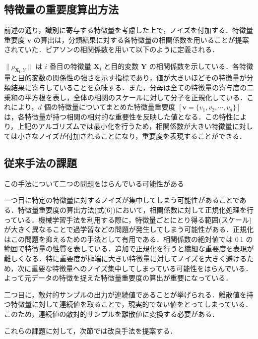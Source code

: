 \subsection{特徴量の重要度算出方法}

前述の通り，識別に寄与する特徴量を考慮した上で，ノイズを付加する．特徴量重要度 $\bm{v}$ の算出は，分類結果に対する各特徴量の相関係数を用いることが提案されていた．ピアソンの相関係数を用いて以下のように定義される．

$\|\rho_{\bm{X_i},Y}\|$ は $i$ 番目の特徴量 $\bm{X_i}$ と目的変数 $\bm{Y}$ の相関係数を示している．各特徴量と目的変数の関係性の強さを示す指標であり，値が大きいほどその特徴量が分類結果に寄与していることを意味する．また，分母は全ての特徴量の寄与度の二乗和の平方根を表し，全体の相関のスケールに対して分子を正規化している．これにより，$d$ 個の特徴量についてまとめた特徴量重要度 $[ \bm{v} = \{v_1, v_2, \cdots, v_d\} ]$ は，各特徴量が持つ相関の相対的な重要性を反映した値となる．この特性により，上記のアルゴリズムでは最小化を行うため，相関係数が大きい特徴量に対しては小さなノイズが付加されることになり，重要度を表現することができる．



\subsection{従来手法の課題}

この手法について二つの問題をはらんでいる可能性がある

一つ目に特定の特徴量に対するノイズが集中してしまう可能性があることである．特徴量重要度の算出方法(式(6))において，相関係数に対して正規化処理を行っている．機械学習手法を利用する際に，特徴量ごとにとり得る範囲(スケール)が大きく異なることで過学習などの問題が発生してしまう可能性がある．正規化はこの問題を抑えるための手法として有用である．\cite{LawOfAwesomeDataScientist}相関係数の絶対値では $0~1$ の範囲で特徴量の性質を表している．追加で正規化を行うと繊細な重要度を表現が難しくなる．特に重要度が極端に大きい特徴量に対してノイズを大きく避けるため，次に重要な特徴量へのノイズ集中してしまっている可能性をはらんでいる．よって元データの特徴を捉えた特徴量重要度の算出が重要になっている．

二つ目に，敵対的サンプルの出力が連続値であることが挙げられる．離散値を持つ特徴量に対して連続値を取ることで，現実的でない値をとってしまっている．このため，連続値の敵対的サンプルを離散値に変換する必要がある．

これらの課題に対して，次節では改良手法を提案する．